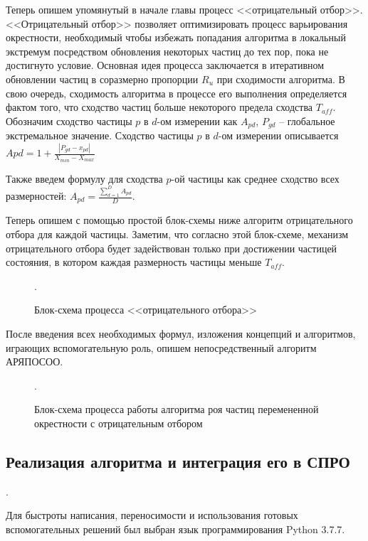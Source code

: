 Теперь опишем упомянутый в начале главы процесс <<отрицательный отбор>>. <<Отрицательный отбор>> позволяет оптимизировать процесс варьирования окрестности, необходимый чтобы избежать попадания алгоритма в локальный экстремум посредством  обновления некоторых частиц до тех пор, пока не достигнуто условие. Основная идея процесса заключается в итеративном обновлении частиц в соразмерно пропорции $R_u$ при сходимости алгоритма. В свою очередь, сходимость алгоритма в процессе его выполнения определяется фактом того, что сходство частиц больше некоторого предела сходства $T_{aff}$. Обозначим сходство частицы $p$ в $d$-ом измерении как $A_{pd}$, $P_{gd}$ -- глобальное экстремальное значение.  %
Сходство частицы $p$ в $d$-ом измерении описывается $A{pd} = 1 + \frac{|P_{gd} - x_{pd}|}{X_{min} - X_{max}}$

Также введем формулу для сходства $p$-ой частицы как среднее сходство всех размерностей: $A_{pd} =  \frac {\sum_{d=1}^{D} A_{pd}} {D}$.

Теперь опишем с помощью простой блок-схемы ниже алгоритм отрицательного отбора для каждой частицы. Заметим, что согласно этой блок-схеме, механизм отрицательного отбора будет задействован только при достижении частицей состояния, в котором  каждая  размерность частицы меньше $T_{aff}$.


\begin{figure*}[h!]
	\caption{Блок-схема процесса <<отрицательного отбора>>}.
\end{figure*} 

После введения всех необходимых формул, изложения концепций и алгоритмов, играющих вспомогательную роль, опишем непосредственный алгоритм АРЯПОСОО. 

\begin{figure*}
	\caption{Блок-схема процесса работы алгоритма роя частиц перемененной окрестности с отрицательным отбором}.
\end{figure*} 

\newpage 

\subsection{Реализация алгоритма и интеграция его в СПРО}.

Для быстроты написания, переносимости и использования готовых вспомогательных решений был выбран язык программирования Python 3.7.7. 

